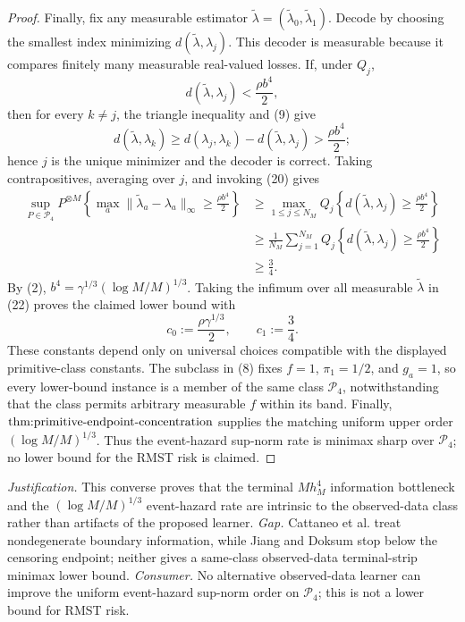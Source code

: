 \documentclass{article}
\begin{document}
\begin{proof}
Finally, fix any measurable estimator \(\widetilde\lambda=(\widetilde\lambda_0,\widetilde\lambda_1)\).  Decode by choosing the smallest index minimizing \(d(\widetilde\lambda,\lambda_j)\).  This decoder is measurable because it compares finitely many measurable real-valued losses.  If, under \(Q_j\),
\[
 d(\widetilde\lambda,\lambda_j)<\frac{\rho b^4}{2},      \tag{21}
\]
then for every \(k\ne j\), the triangle inequality and (9) give
\[
 d(\widetilde\lambda,\lambda_k)
 \ge d(\lambda_j,\lambda_k)-d(\widetilde\lambda,\lambda_j)
 >\frac{\rho b^4}{2};
\]
hence \(j\) is the unique minimizer and the decoder is correct.  Taking contrapositives, averaging over \(j\), and invoking (20) gives
\[
 \begin{split}
 \sup_{P\in\mathcal P_4}P^{\otimes M}\!\left\{
 \max_a\lVert\widetilde\lambda_a-\lambda_a\rVert_\infty
 \ge\frac{\rho b^4}{2}\right\}
 &\ge \max_{1\le j\le N_M}Q_j\!\left\{
 d(\widetilde\lambda,\lambda_j)\ge\frac{\rho b^4}{2}\right\}\\
 &\ge\frac1{N_M}\sum_{j=1}^{N_M}Q_j\!\left\{
 d(\widetilde\lambda,\lambda_j)\ge\frac{\rho b^4}{2}\right\}\\
 &\ge\frac34.                                             \tag{22}
 \end{split}
\]
By (2), \(b^4=\gamma^{1/3}(\log M/M)^{1/3}\).  Taking the infimum over all measurable \(\widetilde\lambda\) in (22) proves the claimed lower bound with
\[
 c_0:=\frac{\rho\gamma^{1/3}}{2},
 \qquad
 c_1:=\frac34.
\]
These constants depend only on universal choices compatible with the displayed primitive-class constants.  The subclass in (8) fixes \(f=1\), \(\pi_1=1/2\), and \(g_a=1\), so every lower-bound instance is a member of the same class \(\mathcal P_4\), notwithstanding that the class permits arbitrary measurable \(f\) within its band.  Finally, \(\textnormal{thm:primitive-endpoint-concentration}\) supplies the matching uniform upper order \((\log M/M)^{1/3}\).  Thus the event-hazard sup-norm rate is minimax sharp over \(\mathcal P_4\); no lower bound for the RMST risk is claimed.
\end{proof}
\par\smallskip\noindent \textit{Justification.} This converse proves that the terminal \(Mh_M^4\) information bottleneck and the \((\log M/M)^{1/3}\) event-hazard rate are intrinsic to the observed-data class rather than artifacts of the proposed learner. \textit{Gap.} Cattaneo et al. treat nondegenerate boundary information, while Jiang and Doksum stop below the censoring endpoint; neither gives a same-class observed-data terminal-strip minimax lower bound. \textit{Consumer.} No alternative observed-data learner can improve the uniform event-hazard sup-norm order on \(\mathcal P_4\); this is not a lower bound for RMST risk.
\end{document}

